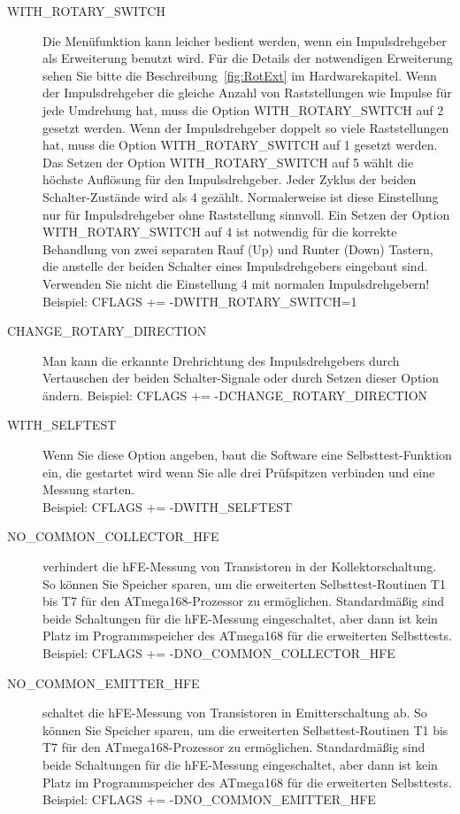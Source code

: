 \begin{description}
  \item[WITH\_ROTARY\_SWITCH] Die Menüfunktion kann leicher bedient werden, wenn ein Impulsdrehgeber als Erweiterung
benutzt wird.
Für die Details der notwendigen Erweiterung sehen Sie bitte die Beschreibung~\ref{fig:RotExt} im Hardwarekapitel.
Wenn der Impulsdrehgeber die gleiche Anzahl von Raststellungen wie Impulse für jede Umdrehung hat,
muss die Option WITH\_ROTARY\_SWITCH auf 2 gesetzt werden.
Wenn der Impulsdrehgeber doppelt so viele Raststellungen hat, muss die Option WITH\_ROTARY\_SWITCH auf 1 gesetzt werden.
Das Setzen der Option WITH\_ROTARY\_SWITCH auf 5 wählt die höchste Auflösung für den Impulsdrehgeber.
Jeder Zyklus der beiden Schalter-Zustände wird als 4 gezählt. Normalerweise ist diese Einstellung nur für
Impulsdrehgeber ohne Raststellung sinnvoll.
Ein Setzen der Option WITH\_ROTARY\_SWITCH auf 4 ist notwendig für die korrekte Behandlung von zwei separaten
Rauf (Up) und Runter (Down) Tastern, die anstelle der beiden Schalter eines Impulsdrehgebers eingebaut sind.
Verwenden Sie nicht die Einstellung 4 mit normalen Impulsdrehgebern!\\
Beispiel: CFLAGS += -DWITH\_ROTARY\_SWITCH=1

  \item[CHANGE\_ROTARY\_DIRECTION] Man kann die erkannte Drehrichtung des Impulsdrehgebers durch Vertauschen
der beiden Schalter-Signale oder durch Setzen dieser Option ändern.
Beispiel: CFLAGS += -DCHANGE\_ROTARY\_DIRECTION

 \item[WITH\_SELFTEST] Wenn Sie diese Option angeben, baut die Software eine Selbsttest-Funktion ein, die gestartet wird
wenn Sie alle drei Prüfspitzen verbinden und eine Messung starten.\\
Beispiel: CFLAGS += -DWITH\_SELFTEST

  \item[NO\_COMMON\_COLLECTOR\_HFE] verhindert die hFE-Messung von Transistoren in der Kollektorschaltung.
So können Sie Speicher sparen, um die erweiterten Selbsttest-Routinen T1 bis T7 für den ATmega168-Prozessor zu ermöglichen.
Standardmäßig sind beide Schaltungen für die hFE-Messung eingeschaltet,
aber dann ist kein Platz im Programmspeicher des ATmega168 für die erweiterten Selbsttests.\\
Beispiel: CFLAGS += -DNO\_COMMON\_COLLECTOR\_HFE

  \item[NO\_COMMON\_EMITTER\_HFE] schaltet die hFE-Messung von Transistoren in Emitterschaltung ab.
So können Sie Speicher sparen, um die erweiterten Selbsttest-Routinen T1 bis T7 für den ATmega168-Prozessor zu ermöglichen.
Standardmäßig sind beide Schaltungen für die hFE-Messung eingeschaltet,
aber dann ist kein Platz im Programmspeicher des ATmega168 für die erweiterten Selbsttests.\\
Beispiel: CFLAGS += -DNO\_COMMON\_EMITTER\_HFE


\end{description}
